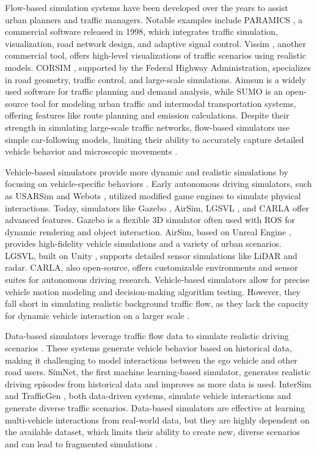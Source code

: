 Flow-based simulation systems have been developed over the years to assist urban planners and traffic managers. Notable examples include PARAMICS \citep{cameron1996paramics}, a commercial software released in 1998, which integrates traffic simulation, visualization, road network design, and adaptive signal control. Vissim \citep{fellendorf2010microscopic}, another commercial tool, offers high-level visualizations of traffic scenarios using realistic models. CORSIM \citep{halati1997corsim}, supported by the Federal Highway Administration, specializes in road geometry, traffic control, and large-scale simulations. Aimsun \citep{barcelo2005dynamic} is a widely used software for traffic planning and demand analysis, while SUMO is an open-source tool for modeling urban traffic and intermodal transportation systems, offering features like route planning and emission calculations. Despite their strength in simulating large-scale traffic networks, flow-based simulators use simple car-following models, limiting their ability to accurately capture detailed vehicle behavior and microscopic movements \citep{kotusevski2009review}.

Vehicle-based simulators provide more dynamic and realistic simulations by focusing on vehicle-specific behaviors \citep{gog2021pylot,xu2023opencda,bockman2024aark}. Early autonomous driving simulators, such as USARSim \citep{carpin2007usarsim} and Webots \citep{michel2004cyberbotics}, utilized modified game engines to simulate physical interactions. Today, simulators like Gazebo \citep{koenig2004design}, AirSim, LGSVL \citep{rong2020lgsvl}, and CARLA offer advanced features. Gazebo is a flexible 3D simulator often used with ROS \citep{quigley2009ros} for dynamic rendering and object interaction. AirSim, based on Unreal Engine \citep{sanders2016introduction}, provides high-fidelity vehicle simulations and a variety of urban scenarios. LGSVL, built on Unity \citep{haas2014history}, supports detailed sensor simulations like LiDAR and radar. CARLA, also open-source, offers customizable environments and sensor suites for autonomous driving research. Vehicle-based simulators allow for precise vehicle motion modeling and decision-making algorithm testing. However, they fall short in simulating realistic background traffic flow, as they lack the capacity for dynamic vehicle interaction on a larger scale \citep{wenl2023limsim}.

Data-based simulators leverage traffic flow data to simulate realistic driving scenarios \citep{hallyburton2023avstack}. These systems generate vehicle behavior based on historical data, making it challenging to model interactions between the ego vehicle and other road users. SimNet, the first machine learning-based simulator, generates realistic driving episodes from historical data and improves as more data is used. InterSim \citep{sun2022intersim} and TrafficGen \citep{feng2023trafficgen}, both data-driven systems, simulate vehicle interactions and generate diverse traffic scenarios. Data-based simulators are effective at learning multi-vehicle interactions from real-world data, but they are highly dependent on the available dataset, which limits their ability to create new, diverse scenarios and can lead to fragmented simulations \citep{mutsch2023model}.


